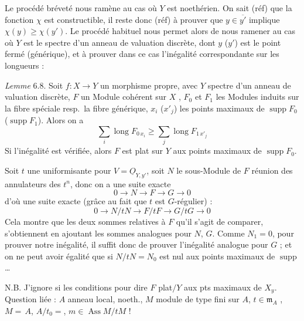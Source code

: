 \documentclass[11pt,a4paper]{article}
\begin{document}
Le procédé bréveté nous ramène au cas où $Y$ est noethérien. On sait (réf)
que la fonction $\chi$ est constructible, il reste donc (réf) à prouver que
$y \in \overline{y'}$ implique $\chi(y) \geqslant \chi(y')$. Le procédé
habituel nous permet alors de nous ramener au cas où $Y$ est le spectre d'un
anneau de valuation discrète, dont $y$ ($y'$) est le point fermé
(générique), et à prouver dans ce cas l'inégalité correspondante sur les
longueurs :

\emph{Lemme} 6.8. Soit $f \colon X \to Y$ un morphisme propre, avec $Y$
spectre d'un anneau de valuation discrète, $F$ un Module cohérent sur $X$
, $F_{0}$ et $F_{1}$ les Modules induits sur la fibre
spéciale resp.\ la fibre générique, $x_{i}$ ($x'_{j}$) les points maximaux de
$\operatorname{supp} F_{0}$ ($\operatorname{supp} F_{1}$). Alors on a
\[
\textstyle\sum_{i} \operatorname{long} F_{0\,x_{i}} \geqslant \sum_{j} \operatorname{long} F_{1\,x'_{j}}
\]
Si l'inégalité est vérifiée, alors $F$ est plat sur $Y$ aux points
maximaux de $\operatorname{supp} F_{0}$.

Soit $t$ une uniformisante pour $V = \underline{O}_{Y,y'}$, soit $N$ le
sous-Module de $F$ réunion des annulateurs des $t^{n}$, donc on a une suite
exacte
\[
0 \to N \to F \to G \to 0
\]
d'où une suite exacte (grâce au fait que $t$ est $G$-régulier) :
\[
0 \to N/tN \to F/tF \to G/tG \to 0
\]
Cela montre que les deux sommes relatives à $F$ qu'il s'agit de comparer,
s'obtiennent en ajoutant les sommes analogues pour $N$, $G$. Comme
$N_{1} = 0$, pour prouver notre inégalité, il suffit donc de prouver
l'inégalité analogue pour $G$ ; et on ne peut avoir égalité que si
$N/tN = N_{0}$ est nul aux points maximaux de $\operatorname{supp}$ \ldots

N.B. J'ignore si les conditions \ill{} \ill{} \ill{} \ill{} \ill{}
 pour dire $F$ plat$/Y$ aux pts maximaux de $X_{y}$.
Question liée : $A$ anneau local, noeth., $M$ module de type fini sur $A$,
$t \in \mathfrak{m}_{A}$ \struck{\ill{}} \ill{} \ill{} 
\ill{}, \ill{} \ill{} \ill{} $M = {}$\ill{}$\,A$, \ill{} $A/t_{0} = {}$\ill{},
\ill{} \ill{} $m \in \operatorname{Ass} M/tM$ !
\end{document}
